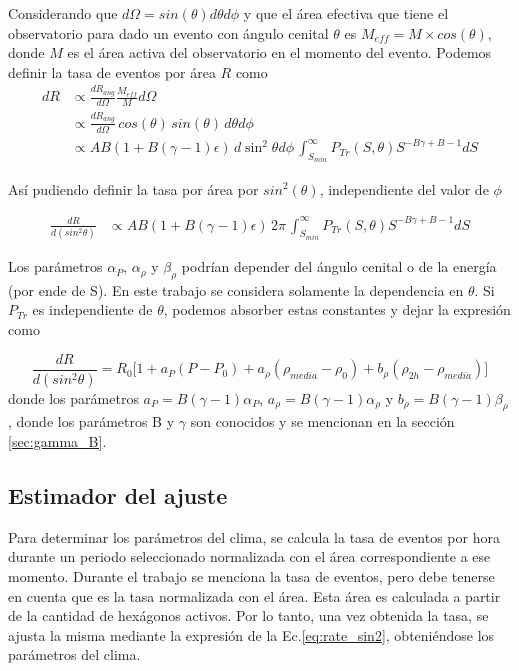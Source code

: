 Considerando que $d\Omega= sin(\theta)d\theta d\phi$ y que el área efectiva  que tiene el observatorio para dado un evento con ángulo cenital $\theta$ es $M_{eff}=M\times cos(\theta)$, donde $M$ es el área activa del observatorio en el momento del evento. Podemos definir la tasa de eventos por área $R$ como
\begin{align*}
	dR 	&\propto \frac{dR_{ang}}{d\Omega} \frac{M_{eff}}{M} d\Omega \\
		&\propto \frac{dR_{ang}}{d\Omega}\, cos(\theta)\, sin(\theta)\,d\theta d\phi\\
		&\propto  AB(1+B(\gamma - 1)\epsilon)\,d\sin^2\theta d\phi\,\int_{S_{min}}^{\infty} P_{Tr}(S,\theta) S^{-B\gamma +B -1} dS
\end{align*}

Así pudiendo definir la tasa por área por $sin^2(\theta)$, independiente del valor de $\phi$

\begin{align*}
	\frac{dR}{d(sin^2\theta)} &\propto AB(1+B(\gamma-1)\epsilon)\, 2\pi \,\int_{S_{min}}^{\infty} P_{Tr}(S,\theta) S^{-B\gamma +B -1} dS
\end{align*}

Los parámetros $\alpha_P$, $\alpha_{\rho}$ y $\beta_{\rho}$ podrían depender del ángulo cenital o de la energía (por ende de S). En este trabajo se considera solamente la dependencia en $\theta$. Si $P_{Tr}$ es independiente de $\theta$, podemos absorber estas constantes y dejar la expresión como

\begin{equation}
	\frac{dR}{d(sin^2\theta)} = R_0\bigg[1+a_P(P-P_0) +a_{\rho}(\rho_{media}-\rho_0) + b_{\rho}(\rho_{2h}-\rho_{media})\bigg] 
	\label{eq:rate_sin2}
\end{equation}
donde los parámetros $a_P=B(\gamma-1)\alpha_{P}$, $a_{\rho}=B(\gamma-1)\alpha_{\rho}$ y $b_{\rho}=B(\gamma-1)\beta_{\rho}$, donde los parámetros B y $\gamma$ son conocidos y se mencionan en la sección \ref{sec:gamma_B}.

\subsection{Estimador del ajuste}

Para determinar los parámetros del clima, se calcula la tasa de eventos por hora durante un periodo seleccionado normalizada con el área correspondiente a ese momento. Durante el trabajo se menciona la tasa de eventos, pero debe tenerse en cuenta que es la tasa normalizada con el área. Esta área es calculada a partir de la cantidad de hexágonos activos. Por lo tanto, una vez obtenida la tasa, se ajusta la misma mediante la expresión de la Ec.\ref{eq:rate_sin2}, obteniéndose los parámetros del clima.


